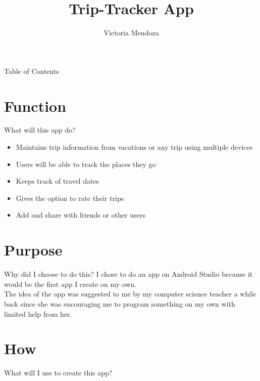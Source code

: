 \documentclass{beamer}
\title{Trip-Tracker App}
\author{Victoria Mendoza}
\institute{University of Texas at El Paso}
\begin{document}
	\maketitle
	\begin{frame}{Table of Contents}
	\tableofcontents
	\end{frame}
	
	\section{Function}
		\begin{frame}{What will this app do?}
			\begin{itemize}
				\item Maintains trip information from vacations or any trip using multiple devices
				\item Users will be able to track the places they go
				\item Keeps track of travel dates
				\item Gives the option to rate their trips
				\item Add and share with friends or other users
			\end{itemize}
		\end{frame}	
	
	\section{Purpose}
		\begin{frame}{Why did I choose to do this?}
				\hspace{.25 in}I chose to do an app on Android Studio because it would be the first app I create on my own.\\ 
				\hspace{.25 in}The idea of the app was suggested to me by my computer science teacher a while back since she was encouraging me to program something on my own with limited help from her. 
		\end{frame}
	
	\section{How}
		\begin{frame}{What will I use to create this app?}
			\begin{center}
			\end{center}
		\end{frame}
	
\end{document}
